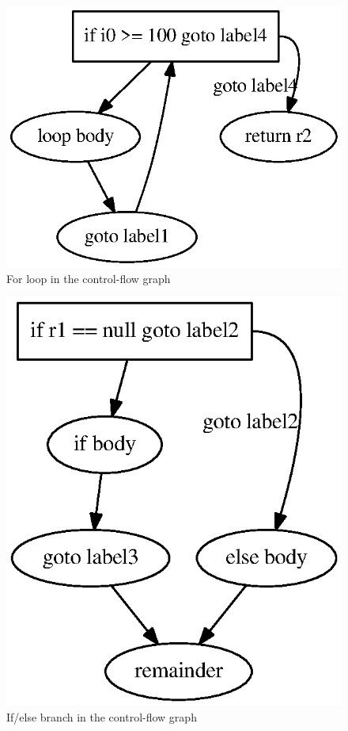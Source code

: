 \begin{figure}[ht]
    \centering
    \includegraphics{CFG-for.eps}
    \caption{For loop in the control-flow graph}
    \label{fig:cfg-for}
\end{figure}

\begin{figure}[ht]
    \centering
    \includegraphics{CFG-ifelse.eps}
    \caption{If/else branch in the control-flow graph}
    \label{fig:cfg-ifelse}
\end{figure}
\pagebreak

